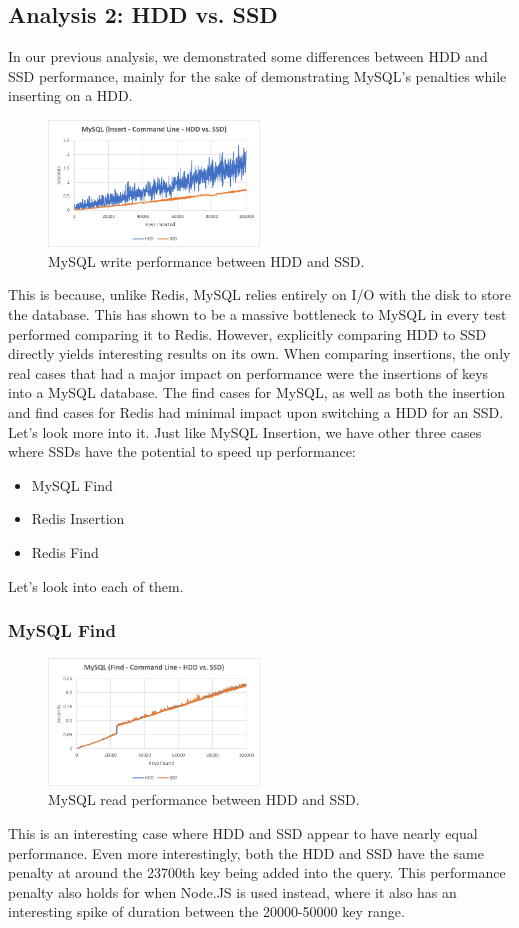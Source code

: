 \documentclass[letterpaper, 10 pt, conference]{ieeeconf}
\begin{document}
\subsection{Analysis 2: HDD vs. SSD}
In our previous analysis, we demonstrated some differences between HDD and SSD performance, mainly for the sake of demonstrating MySQL's penalties while inserting on a HDD.
\begin{figure}[h]
    \centering
    \includegraphics[width=0.5\textwidth]{5.png}
    \caption{MySQL write performance between HDD and SSD.}
    \label{fig:mesh1}
\end{figure}
This is because, unlike Redis, MySQL relies entirely on I/O with the disk to store the database. This has shown to be a massive bottleneck to MySQL in every test performed comparing it to Redis. However, explicitly comparing HDD to SSD directly yields interesting results on its own. When comparing insertions, the only real cases that had a major impact on performance were the insertions of keys into a MySQL database. The find cases for MySQL, as well as both the insertion and find cases for Redis had minimal impact upon switching a HDD for an SSD. Let's look more into it.
Just like MySQL Insertion, we have other three cases where SSDs have the potential to speed up performance:
\begin{itemize}
    \item MySQL Find
    \item Redis Insertion
    \item Redis Find
\end{itemize}

Let's look into each of them.
\subsubsection{MySQL Find}
\begin{figure}[h]
    \centering
    \includegraphics[width=0.5\textwidth]{6.png}
    \caption{MySQL read performance between HDD and SSD.}
    \label{fig:mesh1}
\end{figure}
This is an interesting case where HDD and SSD appear to have nearly equal performance. Even more interestingly, both the HDD and SSD have the same penalty at around the 23700th key being added into the query. This performance penalty also holds for when Node.JS is used instead, where it also has an interesting spike of duration between the 20000-50000 key range.
\end{document}
